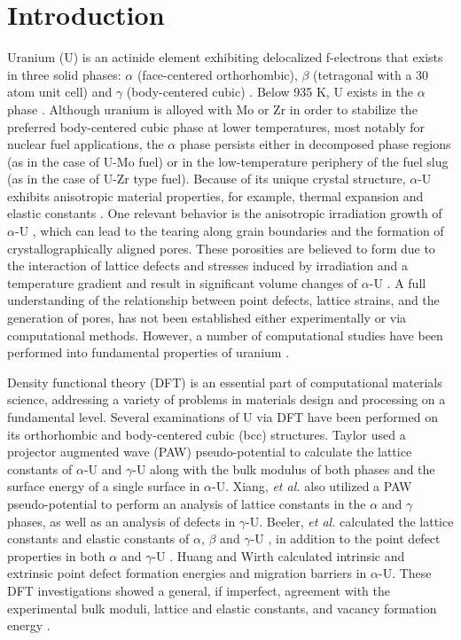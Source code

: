 \documentclass[utf8]{frontiersSCNS} %
\begin{document}
\section{Introduction}

Uranium (U) is an actinide element exhibiting delocalized f-electrons that exists in three solid phases: $\alpha$ (face-centered orthorhombic), $\beta$ (tetragonal with a 30 atom unit cell) and $\gamma$ (body-centered cubic) \cite{yoo1998}. Below 935 K, U exists in the $\alpha$ phase \cite{soderlind1998}. Although uranium is alloyed with Mo or Zr in order to stabilize the preferred body-centered cubic phase at lower temperatures, most notably for nuclear fuel applications, the $\alpha$ phase persists either in decomposed phase regions (as in the case of U-Mo fuel) or in the low-temperature periphery of the fuel slug (as in the case of U-Zr type fuel). Because of its unique crystal structure, $\alpha$-U exhibits anisotropic material properties, for example, thermal expansion \cite{lloyd1966} and elastic constants \cite{fisher1958}. One relevant behavior is the anisotropic irradiation growth of $\alpha$-U \cite{leggett1963}, which can lead to the tearing along grain boundaries and the formation of crystallographically aligned pores. These porosities are believed to form due to the interaction of lattice defects and stresses induced by irradiation and a temperature gradient and result in significant volume changes of $\alpha$-U \cite{leggett1963,paine1958}. A full understanding of the relationship between point defects, lattice strains, and the generation of pores, has not been established either experimentally or via computational methods. However, a number of computational studies have been performed into fundamental properties of uranium \cite{jokisaari2020}. 

Density functional theory (DFT) is an essential part of computational materials science, addressing a variety of problems in materials design and processing on a fundamental level. Several examinations of U via DFT have been performed on its orthorhombic and body-centered cubic (bcc) structures. Taylor \cite{taylor2008} used a projector augmented wave (PAW) pseudo-potential to calculate the lattice constants of $\alpha$-U and $\gamma$-U along with the bulk modulus of both phases and the surface energy of a single surface in $\alpha$-U. Xiang, \textit{et al.} \cite{xiang2008} also utilized a PAW pseudo-potential to perform an analysis of lattice constants in the $\alpha$ and $\gamma$ phases, as well as an analysis of defects in $\gamma$-U. Beeler, \textit{et al.} calculated the lattice constants and elastic constants of $\alpha$, $\beta$ and $\gamma$-U \cite{beeler2013}, in addition to the point defect properties in both $\alpha$ and $\gamma$-U \cite{beeler2010}. Huang and Wirth \cite{wirth2011, wirth2012} calculated intrinsic and extrinsic point defect formation energies and migration barriers in $\alpha$-U. These DFT investigations showed a general, if imperfect, agreement with the experimental bulk moduli, lattice and elastic constants, and vacancy formation energy \cite{yoo1998, barrett1963, matter1980}. 
\end{document}
